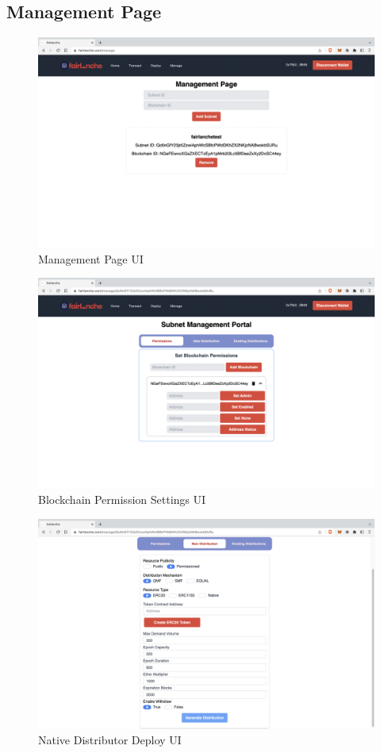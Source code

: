 \documentclass[a4paper,12pt]{report}
\begin{document}
\subsection{Management Page}
\begin{figure}[H]
	\centering
	\includegraphics[width=1\textwidth]{ss4.png}
	\caption{Management Page UI}
\end{figure}
\begin{figure}[H]
	\centering
	\includegraphics[width=1\textwidth]{ss5.png}
	\caption{Blockchain Permission Settings UI}
\end{figure}
\begin{figure}[H]
	\centering
	\includegraphics[width=1\textwidth]{ss6.png}
	\caption{Native Distributor Deploy UI}
\end{figure}
\end{document}
